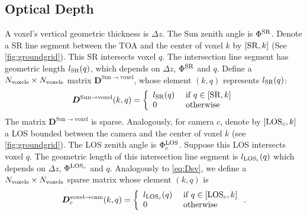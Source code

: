 \documentclass[10pt,letterpaper]{article}
\newcommand{\OpDistance}{\bm{D}}
\begin{document}

\subsection{Optical Depth}
\label{sec:optical-depth}

A voxel's vertical geometric thickness is $\Delta z$.  The Sun zenith
angle is $\Phi^{\rm SR}$. Denote a SR line segment between the TOA and
the center of voxel $k$ by $[{\rm SR},k]$ (See
\cref{fig:groundgrid}). This SR intersects voxel $q$. The intersection
line segment has geometric length $l_{\rm SR}(q)$, which depends on
$\Delta z$, $\Phi^{\rm SR}$ and $q$.  Define a $N_{\rm voxels}\times
N_{\rm voxels}$ matrix $\OpDistance^{\mathrm{Sun \rightarrow voxel}}$,
whose element $(k,q)$ represents $l_{\rm SR}(q)$:
\begin{equation}
  \OpDistance^{\mathrm{Sun \rightarrow voxel}}(k,q) =
  \left\{
    \begin{array}{ll}
      l_{\rm SR}(q) & \mbox{ if $q \in[{\rm SR},k]$} \\
      0  & \mbox{ otherwise}
      \label{eq:Dsv}
    \end{array}
  \right.
  \hspace{-0.05cm}
\end{equation}
The matrix $\OpDistance^{\mathrm{Sun \rightarrow voxel}}$ is sparse.
Analogously, for camera $c$, denote by $[{\rm LOS}_c,k]$ a LOS bounded
between the camera and the center of voxel $k$ (see
\cref{fig:groundgrid}).  The LOS zenith angle is $\Phi^{\rm LOS}_c$.
Suppose this LOS intersects voxel $q$. The geometric length of this
intersection line segment is $l_{\rm LOS_c}(q)$ which depends on
$\Delta z$, $\Phi^{{\rm LOS}_c}$ and $q$.  Analogously to
\cref{eq:Dsv}, we define a $N_{\rm voxels}\times N_{\rm voxels}$
sparse matrix whose element $(k,q)$ is
\begin{equation}
  \OpDistance^{\mathrm{voxel \rightarrow cam}}_c(k,q) =
  \left\{
    \begin{array}{ll}
      l_{{\rm LOS}_c}(q) & \mbox{ if $q \in[{\rm LOS}_c,k]$} \\
      0  & \mbox{ otherwise}
      \label{eq:Dvc}
    \end{array}
  \right.
  .
  \hspace{-0.05cm}
\end{equation}
\end{document}
